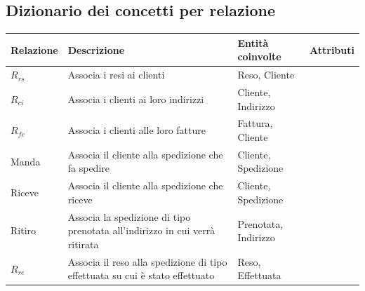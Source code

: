 \subsection{Dizionario dei concetti per relazione}
\begin{table}[H]
	\centering
	\begin{tabularx}{\dimexpr{}\arrayrulewidth}{|*{4}{Y|}} %
		\hline
		\textbf{Relazione} & \textbf{Descrizione} & \textbf{Entità coinvolte} & \textbf{Attributi} \\ \hline
		$R_{rs}$ & Associa i resi ai clienti & Reso, Cliente & \\ 
		\hline
		$R_{ci}$ & Associa i clienti ai loro indirizzi & Cliente, Indirizzo & \\ 
    \hline
    $R_{fc}$ & Associa i clienti alle loro fatture & Fattura, Cliente & \\
    \hline
    Manda & Associa il cliente alla spedizione che fa spedire & Cliente, Spedizione & \\
    \hline 
    Riceve & Associa il cliente alla spedizione che riceve & Cliente, Spedizione & \\
    \hline
    Ritiro & Associa la spedizione di tipo prenotata all'indirizzo in cui verrà ritirata & Prenotata, Indirizzo & \\
    \hline 
    $R_{re}$ & Associa il reso alla spedizione di tipo effettuata su cui è stato effettuato & Reso, Effettuata & \\ \hline 
	\end{tabularx}
\end{table}


